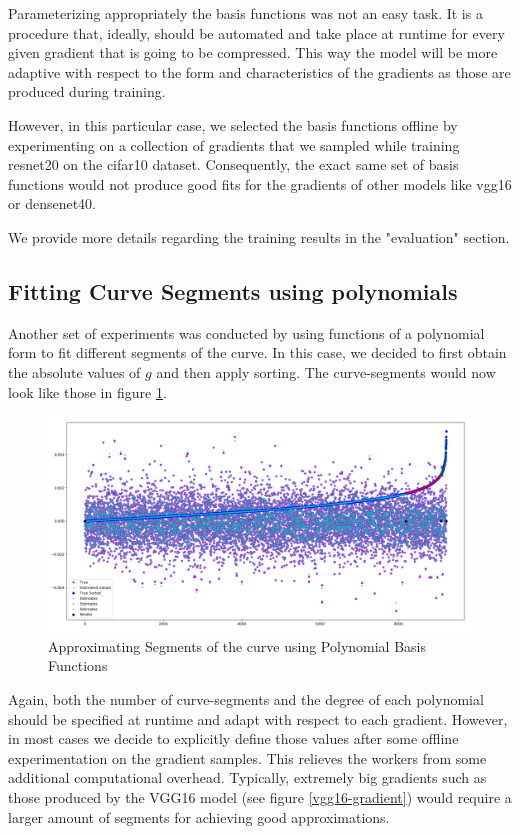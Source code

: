     Parameterizing appropriately the basis functions was not an easy task. 
    It is a procedure that, ideally, should be automated and take place at runtime for every given gradient that is going to be compressed.
    This way the model will be more adaptive with respect to the form and characteristics of the gradients as those are produced during training.
    
    However, in this particular case, we selected the basis functions offline by experimenting on a collection of gradients that we sampled while training resnet20 on the cifar10 dataset.
    Consequently, the exact same set of basis functions would not produce good fits for the gradients of other models like vgg16 or densenet40.
    
    We provide more details regarding the training results in the "evaluation" section.
    
    \newpage
    \subsection{Fitting Curve Segments using polynomials}
    
    Another set of experiments was conducted by using functions of a polynomial form to fit different segments of the curve.
    In this case, we decided to first obtain the absolute values of $g$ and then apply sorting.
    The curve-segments would now look like those in figure \ref{segmented_29}.
    
    \begin{figure}[h]
    \centering
    \includegraphics[width=1\textwidth]{thesis/figures/segmented_29gradient.png}
    \caption{Approximating Segments of the curve using Polynomial Basis Functions}
    \label{segmented_29}
    \end{figure}
    
    Again, both the number of curve-segments and the degree of each polynomial should be specified at runtime and adapt with respect to each gradient.
    However, in most cases we decide to explicitly define those values after some offline experimentation on the gradient samples. This relieves the workers from some additional computational overhead.
    Typically, extremely big gradients such as those produced by the VGG16 model (see figure \ref{vgg16-gradient}) would require a larger amount of segments for achieving good approximations.
    
